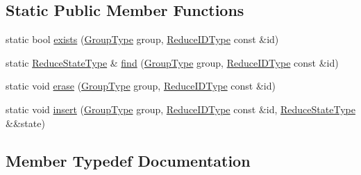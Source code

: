 \subsection*{Static Public Member Functions}
\begin{DoxyCompactItemize}
\item 
static bool \hyperlink{structvt_1_1collective_1_1reduce_1_1_reduce_state_holder_a64f9f3ddff05a936eeb6404a0286af02}{exists} (\hyperlink{namespacevt_a27b5e4411c9b6140c49100e050e2f743}{Group\+Type} group, \hyperlink{structvt_1_1collective_1_1reduce_1_1_reduce_state_holder_a783eeed6422fcc71cea89deca5ed8f08}{Reduce\+I\+D\+Type} const \&id)
\item 
static \hyperlink{structvt_1_1collective_1_1reduce_1_1_reduce_state_holder_a6333d237936c835115b19a7421edf6ec}{Reduce\+State\+Type} \& \hyperlink{structvt_1_1collective_1_1reduce_1_1_reduce_state_holder_afc270038c752da5e6d82b4f09334b8b3}{find} (\hyperlink{namespacevt_a27b5e4411c9b6140c49100e050e2f743}{Group\+Type} group, \hyperlink{structvt_1_1collective_1_1reduce_1_1_reduce_state_holder_a783eeed6422fcc71cea89deca5ed8f08}{Reduce\+I\+D\+Type} const \&id)
\item 
static void \hyperlink{structvt_1_1collective_1_1reduce_1_1_reduce_state_holder_a7b17dcd1d3d44b97078a316839e28d3d}{erase} (\hyperlink{namespacevt_a27b5e4411c9b6140c49100e050e2f743}{Group\+Type} group, \hyperlink{structvt_1_1collective_1_1reduce_1_1_reduce_state_holder_a783eeed6422fcc71cea89deca5ed8f08}{Reduce\+I\+D\+Type} const \&id)
\item 
static void \hyperlink{structvt_1_1collective_1_1reduce_1_1_reduce_state_holder_a562d495edb0992a049e052b939945029}{insert} (\hyperlink{namespacevt_a27b5e4411c9b6140c49100e050e2f743}{Group\+Type} group, \hyperlink{structvt_1_1collective_1_1reduce_1_1_reduce_state_holder_a783eeed6422fcc71cea89deca5ed8f08}{Reduce\+I\+D\+Type} const \&id, \hyperlink{structvt_1_1collective_1_1reduce_1_1_reduce_state_holder_a6333d237936c835115b19a7421edf6ec}{Reduce\+State\+Type} \&\&state)
\end{DoxyCompactItemize}


\subsection{Member Typedef Documentation}
\mbox{\label{structvt_1_1collective_1_1reduce_1_1_reduce_state_holder_a945472a204b8db45e2fdb7f49b7b020a}} 
